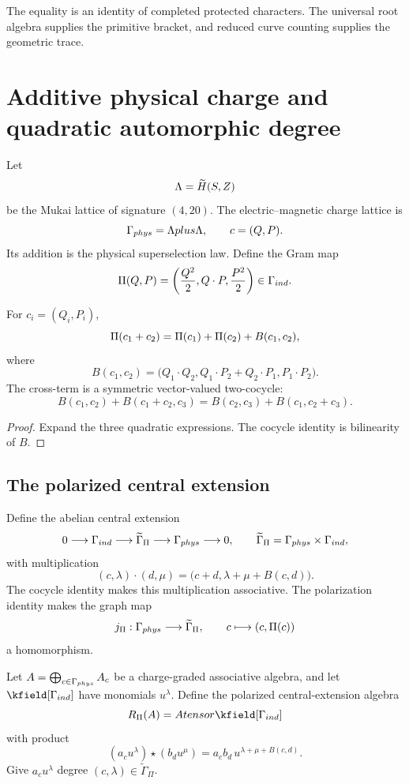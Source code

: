 The equality is an identity of completed protected characters.  The universal root algebra supplies the primitive bracket, and reduced curve counting supplies the geometric trace.

\chapter{Additive physical charge and quadratic automorphic degree}
Let
\[
 \Lambda=\widetilde H(S,Z)
\]
be the Mukai lattice of signature $(4,20)$. The electric--magnetic charge lattice is
\[
 \Gamma_{phys}=\Lambda plus\Lambda,
 \qquad c=(Q,P).
\]
Its addition is the physical superselection law. Define the Gram map
\[
 \Pi(Q,P)=
 \left(\frac{Q^2}{2},Q\cdot P,\frac{P^2}{2}\right)
 \in\Gamma_{ind}.
\]

\begin{proposition}
For $c_i=(Q_i,P_i)$,
\[
 \Pi(c_1+c_2)=\Pi(c_1)+\Pi(c_2)+B(c_1,c_2),
\]
where
\[
 B(c_1,c_2)=
 \bigl(Q_1\cdot Q_2,
 Q_1\cdot P_2+Q_2\cdot P_1,
 P_1\cdot P_2\bigr).
\]
The cross-term is a symmetric vector-valued two-cocycle:
\[
 B(c_1,c_2)+B(c_1+c_2,c_3)
 =B(c_2,c_3)+B(c_1,c_2+c_3).
\]
\end{proposition}
\begin{proof}
Expand the three quadratic expressions. The cocycle identity is bilinearity of $B$.
\end{proof}

\section{The polarized central extension}
Define the abelian central extension
\[
 0\longrightarrow\Gamma_{ind}\longrightarrow
 \widetilde\Gamma_\Pi
 \longrightarrow\Gamma_{phys}\longrightarrow0,
 \qquad
 \widetilde\Gamma_\Pi=\Gamma_{phys}\times\Gamma_{ind},
\]
with multiplication
\[
 (c,\lambda)\cdot(d,\mu)
 =\bigl(c+d,\lambda+\mu+B(c,d)\bigr).
\]
The cocycle identity makes this multiplication associative. The polarization identity makes the graph map
\[
 j_\Pi:\Gamma_{phys}\longrightarrow\widetilde\Gamma_\Pi,
 \qquad c\longmapsto(c,\Pi(c))
\]
a homomorphism.

Let $A=\bigoplus_{c\in\Gamma_{phys}}A_c$ be a charge-graded associative algebra, and let $\kfield[\Gammaind]$ have monomials $u^\lambda$. Define the polarized central-extension algebra
\[
 \mathcal R_\Pi(A)=A\tensor\kfield[\Gammaind]
\]
with product
\[
 (a_cu^\lambda)\star(b_du^\mu)
 =a_cb_d\,u^{\lambda+\mu+B(c,d)}.
\]
Give $a_cu^\lambda$ degree $(c,\lambda)\in\widetilde\Gamma_\Pi$.

